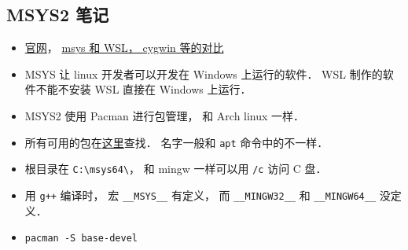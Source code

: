 \subsection{MSYS2 笔记}
\begin{itemize}
\item \href{https://www.msys2.org/}{官网}， \href{https://www.msys2.org/docs/what-is-msys2/}{msys 和 WSL， cygwin 等的对比}
\item MSYS 让 linux 开发者可以开发在 Windows 上运行的软件． WSL 制作的软件不能不安装 WSL 直接在 Windows 上运行．
\item MSYS2 使用 Pacman 进行包管理， 和 Arch linux 一样．
\item 所有可用的包在\href{https://packages.msys2.org/queue}{这里}查找． 名字一般和 \verb|apt| 命令中的不一样．
\item 根目录在 \verb|C:\msys64\|， 和 mingw 一样可以用 \verb|/c| 访问 C 盘．
\item 用 \verb|g++| 编译时， 宏 \verb|__MSYS__| 有定义， 而 \verb|__MINGW32__| 和 \verb|__MINGW64__| 没定义．
\item \verb|pacman -S base-devel|
\end{itemize}

